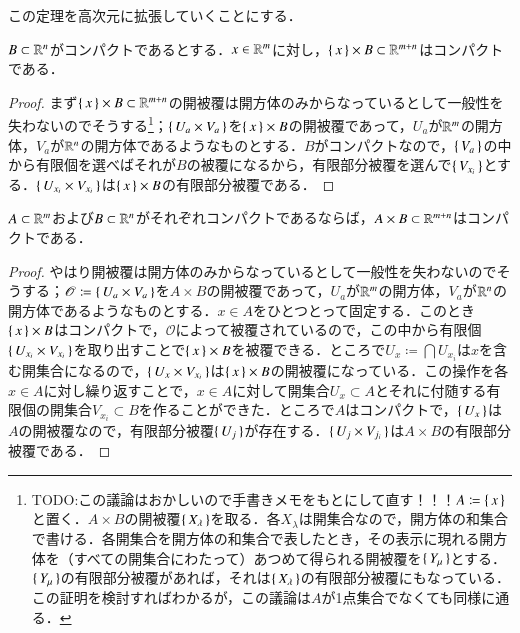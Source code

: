 この定理を高次元に拡張していくことにする．

\begin{lem}
$B \subset \mathbb{R}^n$がコンパクトであるとする．$x\in \mathbb{R}^m$に対し，$\set{x} \times B \subset \mathbb{R}^{m+n}$はコンパクトである．
\end{lem}

\begin{proof}
まず$\set{x} \times B \subset \mathbb{R}^{m+n}$の開被覆は開方体のみからなっているとして一般性を失わないのでそうする\footnote{TODO:この議論はおかしいので手書きメモをもとにして直す！！！$A \coloneqq \set{x}$と置く．$A \times B$の開被覆$\set{X_\lambda}$を取る．各$X_\lambda$は開集合なので，開方体の和集合で書ける．各開集合を開方体の和集合で表したとき，その表示に現れる開方体を（すべての開集合にわたって）あつめて得られる開被覆を$\set{Y_\mu}$とする．$\set{Y_\mu}$の有限部分被覆があれば，それは$\set{X_\lambda}$の有限部分被覆にもなっている．この証明を検討すればわかるが，この議論は$A$が1点集合でなくても同様に通る．}；$\set{U_a \times V_a }$を$\set{x} \times B$の開被覆であって，$U_a$が$\mathbb{R}^m$の開方体，$V_a$が$\mathbb{R}^n$の開方体であるようなものとする．$B$がコンパクトなので，$\set{V_a}$の中から有限個を選べばそれが$B$の被覆になるから，有限部分被覆を選んで$\set{V_{x_i}}$とする．$\set{U_{x_i} \times V_{x_i}}$は$\set{x} \times B$の有限部分被覆である．
\end{proof}

\begin{thm}[Tychonoff]
$A \subset \mathbb{R}^m$および$B \subset \mathbb{R}^n$がそれぞれコンパクトであるならば，$A \times B \subset \mathbb{R}^{m+n}$はコンパクトである．
\end{thm}

\begin{proof}
やはり開被覆は開方体のみからなっているとして一般性を失わないのでそうする；$\mathscr{O} \coloneqq \set{U_a \times V_a }$を$A \times B$の開被覆であって，$U_a$が$\mathbb{R}^m$の開方体，$V_a$が$\mathbb{R}^n$の開方体であるようなものとする．$x \in A$をひとつとって固定する．このとき$\set{x} \times B$はコンパクトで，$\mathscr{O}$によって被覆されているので，この中から有限個$\set{U_{x_i} \times V_{x_i} }$を取り出すことで$\set{x} \times B$を被覆できる．ところで$U_x \coloneqq \bigcap U_{x_i}$は$x$を含む開集合になるので，$\set{U_x \times V_{x_i} }$は$\set{x} \times B$の開被覆になっている．この操作を各$x \in A$に対し繰り返すことで，$x \in A$に対して開集合$U_x \subset A$とそれに付随する有限個の開集合$V_{x_i} \subset B$を作ることができた．ところで$A$はコンパクトで，$\set{U_x}$は$A$の開被覆なので，有限部分被覆$\set{U_j}$が存在する．$\set{U_j \times V_{j_i}}$は$A \times B$の有限部分被覆である．
\end{proof}

